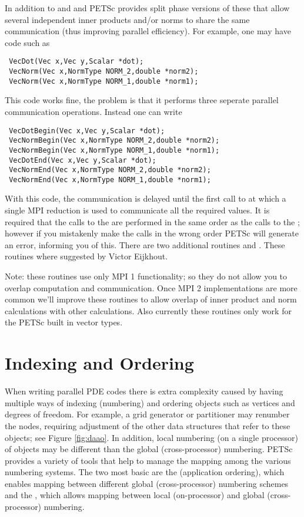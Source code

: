 In addition to  and  and  PETSc provides
split phase versions of these that allow several independent inner products and/or norms
to share the same communication (thus improving parallel efficiency). For example,
one may have code such as 
\begin{verbatim}
 VecDot(Vec x,Vec y,Scalar *dot);
 VecNorm(Vec x,NormType NORM_2,double *norm2);
 VecNorm(Vec x,NormType NORM_1,double *norm1);
\end{verbatim}
This code works fine, the problem is that it performs three seperate parallel communication
operations. Instead one can write 
\begin{verbatim}
 VecDotBegin(Vec x,Vec y,Scalar *dot);
 VecNormBegin(Vec x,NormType NORM_2,double *norm2);
 VecNormBegin(Vec x,NormType NORM_1,double *norm1);
 VecDotEnd(Vec x,Vec y,Scalar *dot);
 VecNormEnd(Vec x,NormType NORM_2,double *norm2);
 VecNormEnd(Vec x,NormType NORM_1,double *norm1);
\end{verbatim}
With this code,    
the  communication is delayed until the first call to  at which 
a single MPI reduction is used to communicate all the required values. It is required that the
calls to the  are performed in the same order as the calls to the 
; however if you mistakenly make the calls in the wrong order PETSc
will generate an error,
informing you of this. There are two additional routines  and 
.  
These routines where suggested by Victor Eijkhout.

Note: these routines use only MPI 1 functionality; so they do not allow you to overlap 
computation and communication. Once MPI 2 implementations are more common we'll improve these
routines to allow overlap of inner product and norm calculations with other calculations.
Also currently these routines only work for the PETSc built in vector types.

\section{Indexing and Ordering}
\label{sec:indexingandordering}

  When writing parallel PDE codes there is extra complexity caused by
having multiple ways of indexing (numbering) and ordering objects such
as vertices and degrees of freedom. For example, a grid generator
or partitioner may renumber the nodes, requiring adjustment of the
other data structures that refer to these objects; see Figure
\ref{fig:daao}.  In addition, local numbering (on a single processor) 
of objects may be different than the global (cross-processor)
numbering. PETSc provides a variety of tools that help to manage the
mapping among the various numbering systems. The two most basic are
the  (application ordering), which enables mapping between
different global (cross-processor) numbering schemes and the , which allows mapping between local 
(on-processor) and global (cross-processor) numbering.

